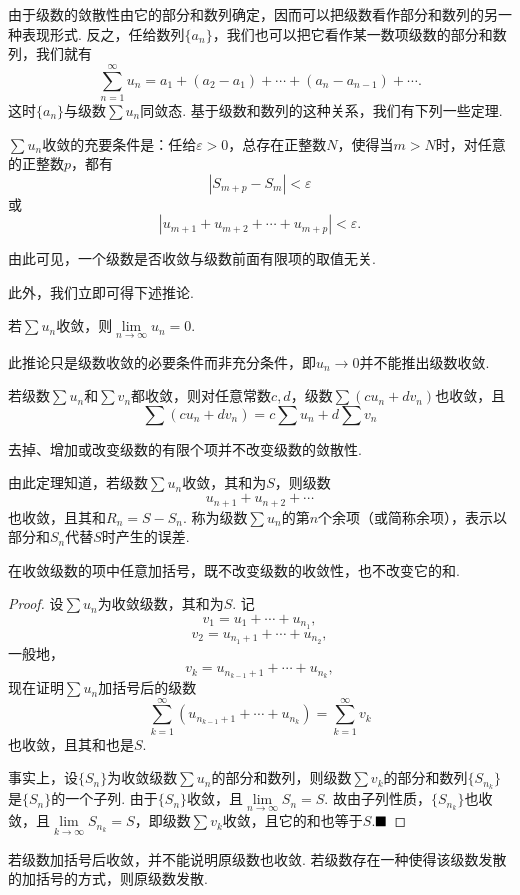 由于级数的敛散性由它的部分和数列确定，因而可以把级数看作部分和数列的另一种表现形式. 反之，任给数列$\{a_n\}$，我们也可以把它看作某一数项级数的部分和数列，我们就有
$$\sum_{n=1}^{\infty}u_n=a_1+(a_2-a_1)+\cdots+(a_n-a_{n-1})+\cdots.$$
这时$\{a_n\}$与级数$\sum u_n$同敛态. 基于级数和数列的这种关系，我们有下列一些定理.
\begin{theorem}[Cauchy准则]
	$\sum u_n$收敛的充要条件是：任给$\varepsilon>0$，总存在正整数$N$，使得当$m>N$时，对任意的正整数$p$，都有
	$$|S_{m+p}-S_m|<\varepsilon$$
	或
	$$|u_{m+1}+u_{m+2}+\cdots+u_{m+p}|<\varepsilon.$$
\end{theorem}
由此可见，一个级数是否收敛与级数前面有限项的取值无关.

此外，我们立即可得下述推论.
\begin{corollary}
	若$\sum u_n$收敛，则$\lim\limits_{n\to\infty}u_n=0$.
\end{corollary}
\begin{remark}
	此推论只是级数收敛的必要条件而非充分条件，即$u_n\to 0$并不能推出级数收敛.
\end{remark}
\begin{theorem}
	若级数$\sum u_n$和$\sum v_n$都收敛，则对任意常数$c,d$，级数$\sum(cu_n+dv_n)$也收敛，且
	$$\sum(cu_n+dv_n)=c\sum u_n+d\sum v_n$$
\end{theorem}
\begin{theorem}
	去掉、增加或改变级数的有限个项并不改变级数的敛散性.
\end{theorem}
由此定理知道，若级数$\sum u_n$收敛，其和为$S$，则级数
$$u_{n+1}+u_{n+2}+\cdots$$
也收敛，且其和$R_n=S-S_n$. 称为级数$\sum u_n$的{\heiti 第$n$个余项}（或简称{\heiti 余项}），表示以部分和$S_n$代替$S$时产生的误差.
\begin{theorem}
	在收敛级数的项中任意加括号，既不改变级数的收敛性，也不改变它的和.
\end{theorem}
\begin{proof}
	设$\sum u_n$为收敛级数，其和为$S$. 记
	$$v_1=u_1+\cdots+u_{n_1},$$
	$$v_2=u_{n_1+1}+\cdots+u_{n_2},$$
	一般地，
	$$v_k=u_{n_{k-1}+1}+\cdots+u_{n_k},$$
	现在证明$\sum u_n$加括号后的级数
	$$\sum_{k=1}^{\infty}(u_{n_{k-1}+1}+\cdots+u_{n_k})=\sum_{k=1}^{\infty}v_k$$
	也收敛，且其和也是$S$.
	
	事实上，设$\{S_n\}$为收敛级数$\sum u_n$的部分和数列，则级数$\sum v_k$的部分和数列$\{S_{n_k}\}$是$\{S_n\}$的一个子列. 由于$\{S_n\}$收敛，且$\lim\limits_{n\to\infty}S_n=S$. 故由子列性质，$\{S_{n_k}\}$也收敛，且$\lim\limits_{k\to\infty}S_{n_k}=S$，即级数$\sum v_k$收敛，且它的和也等于$S$.$\hfill\blacksquare$
\end{proof}
\begin{remark}
	若级数加括号后收敛，并不能说明原级数也收敛. 若级数存在一种使得该级数发散的加括号的方式，则原级数发散.
\end{remark}
